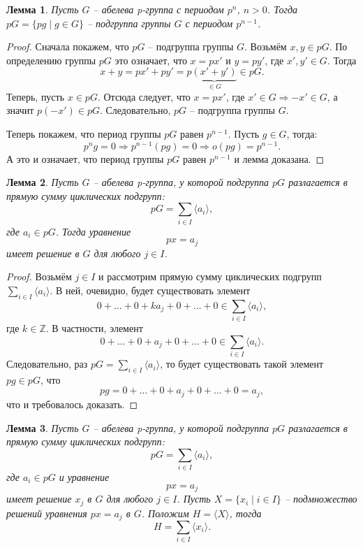 \documentclass{article}
\newtheorem{lemma}{Лемма}[section]
\begin{document}
\begin{lemma}
    Пусть $G$ -- абелева p-группа с периодом $p^n$, $n > 0$. Тогда $pG = \{ pg \mid g \in G \}$ -- подгруппа группы $G$ с периодом $p^{n - 1}$.
\end{lemma}

\begin{proof}
    Сначала покажем, что $pG$ -- подгруппа группы $G$. Возьмём $ x, y \in pG $. По определению группы $pG$ это означает, что $x = px'$ и $y = py'$, где $x', y' \in G$. Тогда $$ x + y = px' + py' = p \underbrace{(x' + y')}_{ \in G} \in pG. $$
    Теперь, пусть $x \in pG$. Отсюда следует, что $x = px'$, где $x' \in G \Rightarrow  -x' \in G $, а значит $ p(-x') \in pG$. Следовательно, $pG$ -- подгруппа группы $G$.

    Теперь покажем, что период группы $pG$ равен $p^{n - 1}$. Пусть $g \in G$, тогда: $$ p^n g = 0 \Rightarrow p^{n - 1} (pg) = 0 \Rightarrow o(pg) = p^{n - 1}. $$
    А это и означает, что период группы $pG$ равен $p^{n - 1}$ и лемма доказана.

\end{proof}

\begin{lemma}
    Пусть $G$ -- абелева p-группа, у которой подгруппа $pG$ разлагается в прямую сумму циклических подгрупп: $$ pG = \sum_{i \in I} \langle a_i \rangle, $$ где $a_i \in pG$. Тогда уравнение $$ px = a_j $$ имеет решение в $G$ для любого $j \in I$.
\end{lemma}

\begin{proof}
    Возьмём $j \in I$ и рассмотрим прямую сумму циклических подгрупп $ \sum_{i \in I} \langle a_i \rangle $. В ней, очевидно, будет существовать элемент $$ 0 + \ldots + 0 + k a_j + 0 + \ldots + 0 \in \sum_{i \in I} \langle a_i \rangle, $$ где $k \in \mathbb{Z}$. В частности, элемент $$ 0 + \ldots + 0 + a_j + 0 + \ldots + 0 \in \sum_{i \in I} \langle a_i \rangle. $$ Следовательно, раз $ pG = \sum_{i \in I} \langle a_i \rangle $, то будет существовать такой элемент $pg \in pG$, что $$ pg =  0 + \ldots + 0 + a_j + 0 + \ldots + 0 = a_j, $$ что и требовалось доказать.
\end{proof}

\begin{lemma}
    Пусть $G$ -- абелева p-группа, у которой подгруппа $pG$ разлагается в прямую сумму циклических подгрупп: $$ pG = \sum_{i \in I} \langle a_i \rangle, $$ где $a_i \in pG$ и уравнение $$ px = a_j $$ имеет решение $x_j$ в $G$ для любого $j \in I$. Пусть $X = \{ x_i \mid i \in I \}$ -- подмножество решений уравнения $px = a_j$ в $G$. Положим $ H = \langle X \rangle $, тогда $$ H = \sum_{i \in I} \langle x_i \rangle. $$
\end{lemma}
\end{document}
